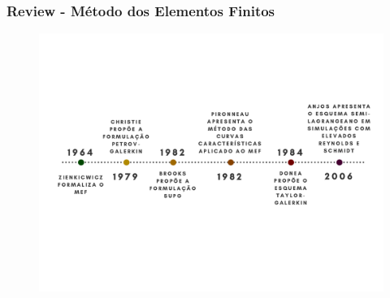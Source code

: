 \begin{frame} 
\frametitle{\Large Review - Método dos Elementos Finitos}
\begin{figure}
  \vspace{-1cm}
  \includegraphics[scale=0.4]{images/mef_review.pdf}
\end{figure}
\end{frame}



